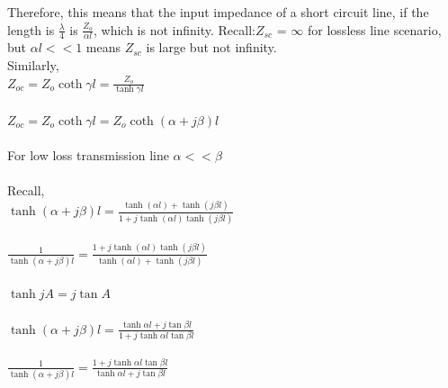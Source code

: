 Therefore, this means that the input impedance of a short circuit line, if the length is $ \frac{\lambda}{4} $ is $ \frac{Z_{o}}{\alpha l} $, which is not infinity. Recall:$ Z_{sc} $ = $ \infty $ for lossless line scenario, but $ \alpha l << 1 $ means $ Z_{sc} $ is large but not infinity.\\

Similarly,\\
$ Z_{oc}=Z_{o}\coth\gamma l=\frac{Z_{o}}{\tanh\gamma l} $\\\\
$ Z_{oc}=Z_{o}\coth\gamma l=Z_{o}\coth(\alpha+j\beta) l $\\\\
For low loss transmission line $ \alpha<<\beta $ \\\\Recall,\\
$ \tanh(\alpha+j\beta)l=\frac{\tanh (\alpha l) + \tanh (j\beta l)}{1 +j \tanh (\alpha l)\tanh (j\beta l)} $\\\\
$ \frac{1}{\tanh(\alpha+j\beta)l}=\frac{1 + j\tanh (\alpha l)\tanh (j\beta l)}{\tanh (\alpha l) + \tanh (j\beta l)} $\\\\
$ \tanh jA= j \tan A $\\\\
$ \tanh(\alpha+j\beta)l=\frac{\tanh \alpha l+j\tan \beta l}{1+j\tanh \alpha l\tan \beta l} $\\\\
$ \frac{1}{\tanh(\alpha+j\beta)l}=\frac{1+j\tanh \alpha l\tan \beta l}{\tanh \alpha l+j\tan \beta l} $

